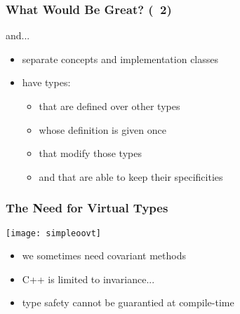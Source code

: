\begin{frame}
  \frametitle{What Would Be Great? (\scoop~2)}

and...

\smallskip

\begin{itemize}
\item separate concepts and implementation classes
%
\smallskip
%
\item have types:
  \begin{itemize}
  \item that are defined over other types
  \item whose definition is given once
  \item that modify those types
  \item and that are able to keep their specificities
  \end{itemize}
\end{itemize}

\end{frame}




\begin{frame}
  \frametitle{The Need for Virtual Types}


\begin{multicols}{2}
%
  \begin{center}
    \texttt{[image: simpleoovt]}
  \end{center}
%
\columnbreak
%
\begin{itemize}
\item we sometimes need covariant methods
\item C++ is limited to invariance...
\item type safety cannot be guarantied at compile-time
\end{itemize}
%
\end{multicols}

\end{frame}



